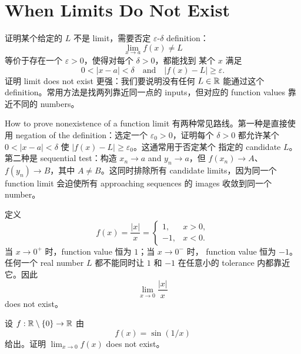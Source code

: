 \section{When Limits Do Not Exist}

证明某个给定的 \(L\) 不是 limit，需要否定 \(\varepsilon\)-\(\delta\)
definition：
\[
  \lim_{x\to a}f(x)\neq L
\]
等价于存在一个 \(\varepsilon>0\)，使得对每个 \(\delta>0\)，都能找到
某个 \(x\) 满足
\[
  0<|x-a|<\delta
  \quad\text{and}\quad
  |f(x)-L|\geq\varepsilon.
\]
证明 limit does not exist 更强：我们要说明没有任何 \(L\in\mathbb{R}\) 能通过这个
definition。常用方法是找两列靠近同一点的 inputs，但对应的 function values
靠近不同的 numbers。

\begin{reviewbox}{How to prove nonexistence of a function limit}
有两种常见路线。第一种是直接使用 negation of the definition：选定一个
\(\varepsilon_0>0\)，证明每个 \(\delta>0\) 都允许某个
\(0<|x-a|<\delta\) 使 \(|f(x)-L|\geq\varepsilon_0\)。这通常用于否定某个
指定的 candidate \(L\)。第二种是 sequential test：构造
\(x_n\to a\) and \(y_n\to a\)，但 \(f(x_n)\to A\)、\(f(y_n)\to B\)，其中
\(A\neq B\)。这同时排除所有 candidate limits，因为同一个 function limit
会迫使所有 approaching sequences 的 images 收敛到同一个 number。
\end{reviewbox}

\begin{example}
定义
\[
  f(x)=\frac{|x|}{x}
  =
  \begin{cases}
    1, & x>0,\\
    -1, & x<0.
  \end{cases}
\]
当 \(x\to0^+\) 时，function value 恒为 \(1\)；当 \(x\to0^-\) 时，
function value 恒为 \(-1\)。任何一个 real number \(L\) 都不能同时让
\(1\) 和 \(-1\) 在任意小的 tolerance 内都靠近它。因此
\[
  \lim_{x\to0}\frac{|x|}{x}
\]
does not exist。
\end{example}

\begin{exerciseblock}
设 \(f:\mathbb{R}\setminus\{0\}\to\mathbb{R}\) 由
\[
  f(x)=\sin(1/x)
\]
给出。证明 \(\lim_{x\to0}f(x)\) does not exist。
\end{exerciseblock}

